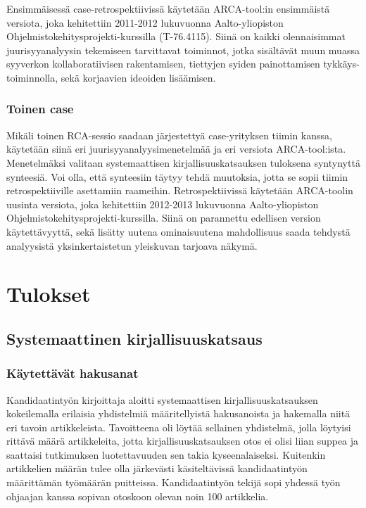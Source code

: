 Ensimmäisessä case-retrospektiivissä käytetään ARCA-tool:in ensimmäistä versiota, joka kehitettiin 2011-2012 lukuvuonna Aalto-yliopiston Ohjelmistokehitysprojekti-kurssilla (T-76.4115). Siinä on kaikki olennaisimmat juurisyyanalyysin tekemiseen tarvittavat toiminnot, jotka sisältävät muun muassa syyverkon kollaboratiivisen rakentamisen, tiettyjen syiden painottamisen tykkäys-toiminnolla, sekä korjaavien ideoiden lisäämisen.

\subsubsection{Toinen case}
Mikäli toinen RCA-sessio saadaan järjestettyä case-yrityksen tiimin kanssa, käytetään siinä eri juurisyyanalyysimenetelmää ja eri versiota ARCA-tool:ista. Menetelmäksi valitaan systemaattisen kirjallisuuskatsauksen tuloksena syntynyttä synteesiä. Voi olla, että synteesiin täytyy tehdä muutoksia, jotta se sopii tiimin retrospektiiville asettamiin raameihin. Retrospektiivissä käytetään ARCA-toolin uusinta versiota, joka kehitettiin 2012-2013 lukuvuonna Aalto-yliopiston Ohjelmistokehitysprojekti-kurssilla. Siinä on parannettu edellisen version käytettävyyttä, sekä lisätty uutena ominaisuutena mahdollisuus saada tehdystä analyysistä yksinkertaistetun yleiskuvan tarjoava näkymä.

\section{Tulokset}
\subsection{Systemaattinen kirjallisuuskatsaus}
\subsubsection{Käytettävät hakusanat}
Kandidaatintyön kirjoittaja aloitti systemaattisen kirjallisuuskatsauksen kokeilemalla erilaisia yhdistelmiä määritellyistä hakusanoista ja hakemalla niitä eri tavoin artikkeleista. Tavoitteena oli löytää sellainen yhdistelmä, jolla löytyisi rittävä määrä artikkeleita, jotta kirjallisuuskatsauksen otos ei olisi liian suppea ja saattaisi tutkimuksen luotettavuuden sen takia kyseenalaiseksi. Kuitenkin artikkelien määrän tulee olla järkevästi käsiteltävissä kandidaatintyön määrittämän työmäärän puitteissa. Kandidaatintyön tekijä sopi yhdessä työn ohjaajan kanssa sopivan otoskoon olevan noin 100 artikkelia.

